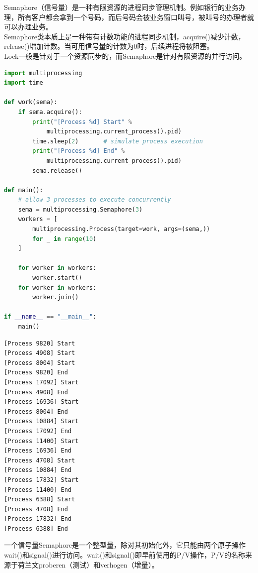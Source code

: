 Semaphore（信号量）是一种有限资源的进程同步管理机制。例如银行的业务办理，所有客户都会拿到一个号码，而后号码会被业务窗口叫号，被叫号的办理者就可以办理业务。\\

Semaphore类本质上是一种带有计数功能的进程同步机制，acquire()减少计数，release()增加计数。当可用信号量的计数为0时，后续进程将被阻塞。\\

Lock一般是针对于一个资源同步的，而Semaphore是针对有限资源的并行访问。\\


\begin{lstlisting}[language=Python]
import multiprocessing
import time

def work(sema):
    if sema.acquire():
        print("[Process %d] Start" % 
            multiprocessing.current_process().pid)
        time.sleep(2)       # simulate process execution
        print("[Process %d] End" % 
            multiprocessing.current_process().pid)
        sema.release()

def main():
    # allow 3 processes to execute concurrently
    sema = multiprocessing.Semaphore(3)
    workers = [
        multiprocessing.Process(target=work, args=(sema,))
        for _ in range(10)
    ]

    for worker in workers:
        worker.start()
    for worker in workers:
        worker.join()

if __name__ == "__main__":
    main()
\end{lstlisting}

\begin{tcolorbox}
    \begin{verbatim}
[Process 9820] Start
[Process 4908] Start
[Process 8004] Start
[Process 9820] End
[Process 17092] Start
[Process 4908] End
[Process 16936] Start
[Process 8004] End
[Process 10884] Start
[Process 17092] End
[Process 11400] Start
[Process 16936] End
[Process 4708] Start
[Process 10884] End
[Process 17832] Start
[Process 11400] End
[Process 6388] Start
[Process 4708] End
[Process 17832] End
[Process 6388] End
	\end{verbatim}
\end{tcolorbox}

一个信号量Semaphore是一个整型量，除对其初始化外，它只能由两个原子操作wait()和signal()进行访问。wait()和signal()即早前使用的P/V操作，P/V的名称来源于荷兰文proberen（测试）和verhogen（增量）。

